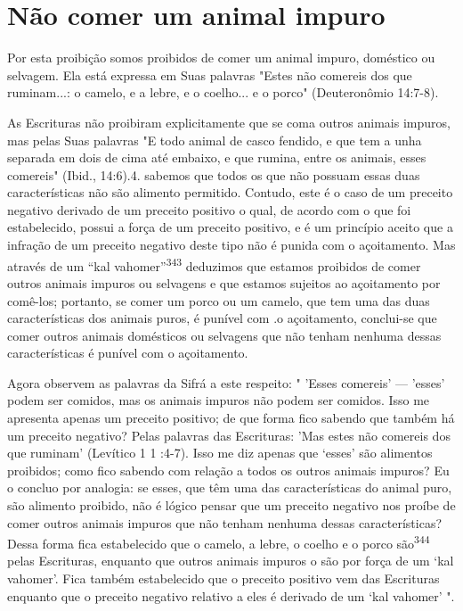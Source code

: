 \section{Não comer um animal impuro}

Por esta proibição somos proibidos de comer um animal impuro, doméstico
ou selvagem. Ela está expressa em Suas palavras "Estes não come­reis dos
que ruminam...: o camelo, e a lebre, e o coelho... e o porco"
(Deutero­nômio 14:7-8).

As Escrituras não proibiram explicitamente que se coma outros ani­mais
impuros, mas pelas Suas palavras "E todo animal de casco fendido, e que
tem a unha separada em dois de cima até embaixo, e que rumina, entre os
ani­mais, esses comereis" (Ibid.,
14:6).4. sabemos que todos os que
não possuam essas duas características não são alimento permitido.
Contudo, este é o caso de um preceito negativo derivado de um preceito
positivo o qual, de acordo com o que foi estabelecido, possui a força de
um preceito positivo, e é um princípio aceito que a infração de um
preceito negativo deste tipo não é puni­da com o açoitamento. Mas
através de um ``kal vahomer''\textsuperscript{343} deduzimos que estamos
proibidos de comer outros animais impuros ou selvagens e que esta­mos
sujeitos ao açoitamento por comê-los; portanto, se comer um porco ou um
camelo, que tem uma das duas características dos animais puros, é
puní­vel com .o açoitamento, conclui-se que comer outros animais
domésticos ou selvagens que não tenham nenhuma dessas características é
punível com o açoitamento.

Agora observem as palavras da Sifrá a este respeito: " 'Esses come­reis'
--- 'esses' podem ser comidos, mas os animais impuros não podem ser
co­midos. Isso me apresenta apenas um preceito positivo; de que forma
fico sa­bendo que também há um preceito negativo? Pelas palavras das
Escrituras: 'Mas estes não comereis dos que ruminam' (Levítico 1 1
:4-7). Isso me diz apenas que `esses' são alimentos proibidos; como fico
sabendo com relação a todos os ou­tros animais impuros? Eu o concluo por
analogia: se esses, que têm uma das características do animal puro, são
alimento proibido, não é lógico pensar que um preceito negativo nos
proíbe de comer outros animais impuros que não tenham nenhuma dessas
características? Dessa forma fica estabelecido que o camelo, a lebre, o
coelho e o porco são\textsuperscript{344} pelas Escrituras, enquanto que
ou­tros animais impuros o são por força de um `kal vahomer'. Fica também
estabe­lecido que o preceito positivo vem das Escrituras enquanto que o
preceito ne­gativo relativo a eles é derivado de um `kal vahomer' ".

